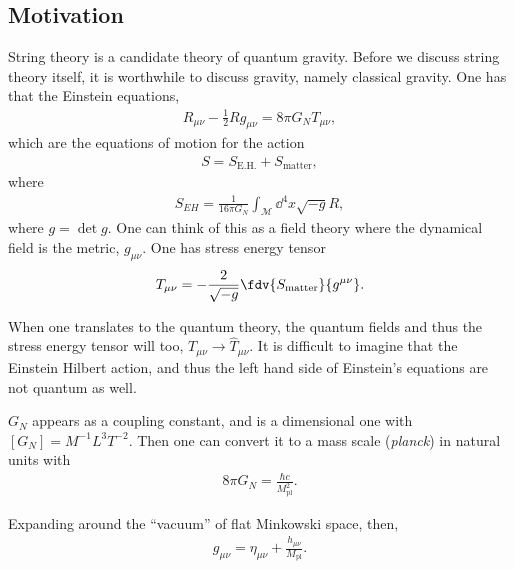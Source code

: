 
\subsection{Motivation}

String theory is a candidate theory of quantum gravity. Before we discuss string theory itself, it is worthwhile to discuss gravity, namely classical gravity. One has that the Einstein equations,
\begin{align}
    R_{\mu \nu} - \frac{1}{2} R g_{\mu \nu} = 8 \pi G_{N} T_{\mu \nu}
,\end{align}
which are the equations of motion for the action
\begin{align}
    S = S_{\text{E.H.}} + S_\text{matter}
,\end{align}
where
\begin{align}
    S_{EH} = \frac{1}{16 \pi G_{N}} \int_{\mathcal{M}} \dd{^{4} x} \sqrt{-g}  R
,\end{align}
where $g = \det g$. One can think of this as a field theory where the dynamical field is the metric, $g_{\mu \nu}$. One has stress energy tensor
\begin{align}
    T_{\mu \nu} = -\frac{2}{\sqrt{-g} } \fdv{S_\text{matter}}{g^{\mu \nu}}
.\end{align}

When one translates to the quantum theory, the quantum fields and thus the stress energy tensor will too, $T_{\mu \nu} \to \hat{T}_{\mu \nu}$. It is difficult to imagine that the Einstein Hilbert action, and thus the left hand side of Einstein's equations are not quantum as well.

$G_N$ appears as a coupling constant, and is a dimensional one with $\left[ G_N \right] = M^{-1} L^3 T^{-2}$. Then one can convert it to a mass scale (\textit{planck}) in natural units with
\begin{align}
    8 \pi G_N = \frac{\hbar c}{M^2_{\text{pl}}}
.\end{align}

Expanding around the ``vacuum'' of flat Minkowski space, then,
\begin{align}
    g_{\mu \nu} = \eta_{\mu \nu} + \frac{h_{\mu \nu}}{M_\text{pl}}
.\end{align}

